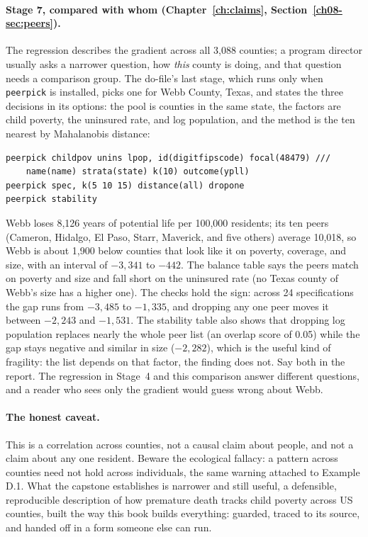 \paragraph{Stage 7, compared with whom (Chapter~\ref{ch:claims}, Section~\ref{ch08-sec:peers}).} The regression describes the gradient across all 3,088 counties; a program director usually asks a narrower question, how \emph{this} county is doing, and that question needs a comparison group. The do-file's last stage, which runs only when \texttt{peerpick} is installed, picks one for Webb County, Texas, and states the three decisions in its options: the pool is counties in the same state, the factors are child poverty, the uninsured rate, and log population, and the method is the ten nearest by Mahalanobis distance:
\par
{\footnotesize
\begin{verbatim}
peerpick childpov unins lpop, id(digitfipscode) focal(48479) ///
    name(name) strata(state) k(10) outcome(ypll)
peerpick spec, k(5 10 15) distance(all) dropone
peerpick stability
\end{verbatim}
}
Webb loses 8,126 years of potential life per 100,000 residents; its ten peers (Cameron, Hidalgo, El Paso, Starr, Maverick, and five others) average 10,018, so Webb is about 1,900 below counties that look like it on poverty, coverage, and size, with an interval of $-3{,}341$ to $-442$. The balance table says the peers match on poverty and size and fall short on the uninsured rate (no Texas county of Webb's size has a higher one). The checks hold the sign: across 24 specifications the gap runs from $-3{,}485$ to $-1{,}335$, and dropping any one peer moves it between $-2{,}243$ and $-1{,}531$. The stability table also shows that dropping log population replaces nearly the whole peer list (an overlap score of 0.05) while the gap stays negative and similar in size ($-2{,}282$), which is the useful kind of fragility: the list depends on that factor, the finding does not. Say both in the report. The regression in Stage~4 and this comparison answer different questions, and a reader who sees only the gradient would guess wrong about Webb.

\paragraph{The honest caveat.} This is a correlation across counties, not a causal claim about people, and not a claim about any one resident. Beware the ecological fallacy: a pattern across counties need not hold across individuals, the same warning attached to Example D.1. What the capstone establishes is narrower and still useful, a defensible, reproducible description of how premature death tracks child poverty across US counties, built the way this book builds everything: guarded, traced to its source, and handed off in a form someone else can run.

